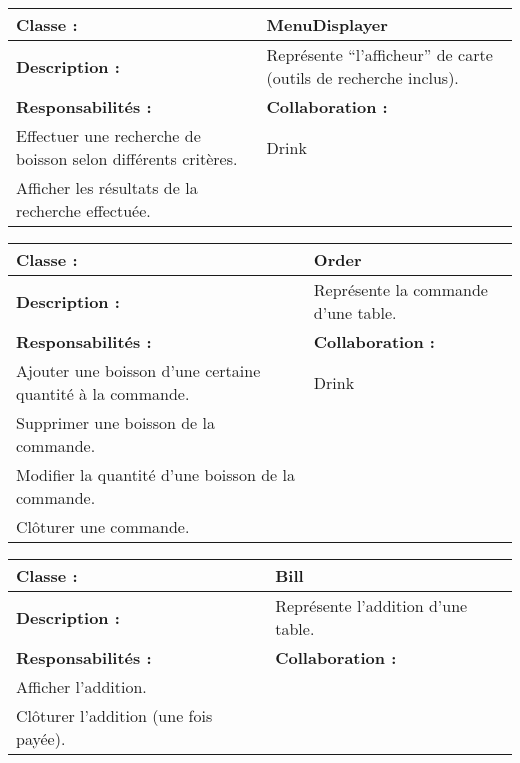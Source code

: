 \begin{center}
\vspace{0.5cm}

\begin{tabular}{|p{6cm}p{6cm}|}
	\hline
		\textbf{Classe :} & MenuDisplayer \\
	\hline
		\textbf{Description :} & Représente ``l'afficheur'' de carte (outils de recherche
		inclus). \\
	\hline
		\textbf{Responsabilités :} & \textbf{Collaboration :} \\
		Effectuer une recherche de boisson selon		différents critères. & Drink \\

		Afficher les résultats de la recherche effectuée. & \\
	\hline		
\end{tabular}

\vspace{0.5cm}

\begin{tabular}{|p{6cm}p{6cm}|}
	\hline
		\textbf{Classe :} & Order \\
	\hline
		\textbf{Description :} & Représente la commande d'une table. \\
	\hline
		\textbf{Responsabilités :} & \textbf{Collaboration :} \\

		Ajouter une boisson d'une certaine quantité à la commande. & Drink \\
		Supprimer une boisson de la commande. & \\
		Modifier la quantité d'une boisson de la commande. & \\
		Clôturer une commande. & \\
	\hline		
\end{tabular}

\vspace{0.5cm}

\begin{tabular}{|p{6cm}p{6cm}|}
	\hline
		\textbf{Classe :} & Bill \\
	\hline
		\textbf{Description :} & Représente l'addition d'une table. \\
	\hline
		\textbf{Responsabilités :} & \textbf{Collaboration :} \\
		Afficher l'addition. & \\
		Clôturer l'addition (une fois payée). & \\
	\hline		
\end{tabular}

\vspace{0.5cm}


\end{center}
